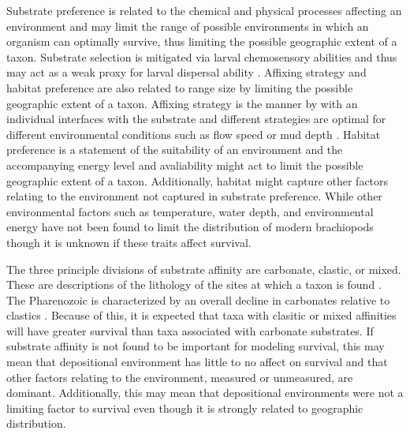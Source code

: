 \documentclass[12pt,letterpaper]{article}
\begin{document}
Substrate preference is related to the chemical and physical processes affecting an environment and may limit the range of possible environments in which an organism can optimally survive, thus limiting the possible geographic extent of a taxon. Substrate selection is mitigated via larval chemosensory abilities and thus may act as a weak proxy for larval dispersal ability \citep{Jablonski2006a,Jablonski1983}. Affixing strategy and habitat preference are also related to range size by limiting the possible geographic extent of a taxon. Affixing strategy is the manner by with an individual interfaces with the substrate and different strategies are optimal for different environmental conditions such as flow speed or mud depth \citep{Alexander1977,LaBarbera1978,LaBarbera1981}. Habitat preference is a statement of the suitability of an environment and the accompanying energy level and avaliability might act to limit the possible geographic extent of a taxon. Additionally, habitat might capture other factors relating to the environment not captured in substrate preference. While other environmental factors such as temperature, water depth, and environmental energy have not been found to limit the distribution of modern brachiopods \citep{Richardson1997,Richardson1997a} though it is unknown if these traits affect survival.

The three principle divisions of substrate affinity are carbonate, clastic, or mixed. These are descriptions of the lithology of the sites at which a taxon is found \citep{Foote2006,Anderson2011a,Nurnberg2013a,Kiessling2007a,Miller2001}. The Pharenozoic is characterized by an overall decline in carbonates relative to clastics \citep{Foote2006,Miller2001}. Because of this, it is expected that taxa with clasitic or mixed affinities will have greater survival than taxa associated with carbonate substrates. If substrate affinity is not found to be important for modeling survival, this may mean that depositional environment has little to no affect on survival and that other factors relating to the environment, measured or unmeasured, are dominant. Additionally, this may mean that depositional environments were not a limiting factor to survival even though it is strongly related to geographic distribution. 
\end{document}
